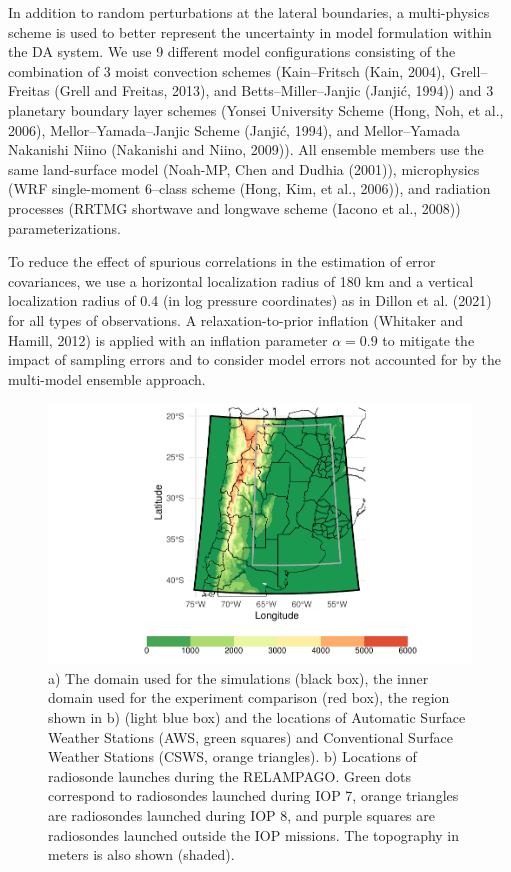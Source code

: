 \documentclass[final,5p,times,twocolumn,authoryear]{elsarticle} %
\begin{document}
In addition to random perturbations at the lateral boundaries, a multi-physics scheme is used to better represent the uncertainty in model formulation within the DA system. We use 9 different model configurations consisting of the combination of 3 moist convection schemes (Kain--Fritsch (Kain, 2004), Grell--Freitas (Grell and Freitas, 2013), and Betts--Miller--Janjic (Janjić, 1994)) and 3 planetary boundary layer schemes (Yonsei University Scheme (Hong, Noh, et al., 2006), Mellor--Yamada--Janjic Scheme (Janjić, 1994), and Mellor--Yamada Nakanishi Niino (Nakanishi and Niino, 2009)). All ensemble members use the same land-surface model (Noah-MP, Chen and Dudhia (2001)), microphysics (WRF single-moment 6--class scheme (Hong, Kim, et al., 2006)), and radiation processes (RRTMG shortwave and longwave scheme (Iacono et al., 2008)) parameterizations.

To reduce the effect of spurious correlations in the estimation of error covariances, we use a horizontal localization radius of 180 km and a vertical localization radius of 0.4 (in log pressure coordinates) as in Dillon et al. (2021) for all types of observations.
A relaxation-to-prior inflation (Whitaker and Hamill, 2012) is applied with an inflation parameter \(\alpha=0.9\) to mitigate the impact of sampling errors and to consider model errors not accounted for by the multi-model ensemble approach.



\begin{figure}
\includegraphics[width=1\linewidth]{../figures/dominio-1} \caption{a) The domain used for the simulations (black box), the inner domain used for the experiment comparison (red box), the region shown in b) (light blue box) and the locations of Automatic Surface Weather Stations (AWS, green squares) and Conventional Surface Weather Stations (CSWS, orange triangles). b) Locations of radiosonde launches during the RELAMPAGO. Green dots correspond to radiosondes launched during IOP 7, orange triangles are radiosondes launched during IOP 8, and purple squares are radiosondes launched outside the IOP missions. The topography in meters is also shown (shaded).}\label{fig:dominio}
\end{figure}
\end{document}

